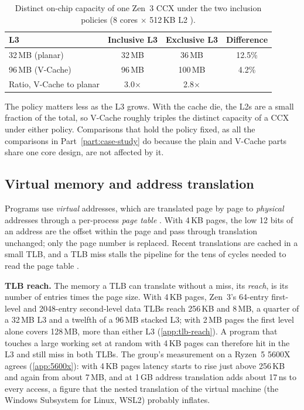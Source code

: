 \begin{table}[htbp]
  \centering
  \caption[Distinct on-chip capacity of one Zen~3 CCX under the two inclusion policies]{Distinct on-chip capacity of one Zen~3 CCX under the two inclusion policies (8 cores $\times$ 512\,KB L2 \cite[sec.~2.2]{amd2022epyc7003}).}
  \label{tab:inclusion-example}
  \small
  \begin{tabular}{@{}lccc@{}}
    \toprule
    \textbf{L3} & \textbf{Inclusive L3} & \textbf{Exclusive L3} & \textbf{Difference} \\
    \midrule
    32\,MB (planar) & 32\,MB & 36\,MB & 12.5\% \\
    96\,MB (V-Cache) & 96\,MB & 100\,MB & 4.2\% \\
    \midrule
    Ratio, V-Cache to planar & 3.0$\times$ & 2.8$\times$ & \\
    \bottomrule
  \end{tabular}
\end{table}

The policy matters less as the L3 grows. With the cache die, the L2s are a small fraction of the total, so V-Cache roughly triples the distinct capacity of a CCX under either policy. Comparisons that hold the policy fixed, as all the comparisons in Part~\ref{part:case-study} do because the plain and V-Cache parts share one core design, are not affected by it.

\subsection{Virtual memory and address translation}
\label{sec:virtual-memory}
Programs use \emph{virtual} addresses, which are translated page by page to \emph{physical} addresses through a per-process \emph{page table} \cite[sec.~11.4.3]{sarangi2025basic}. With 4\,KB pages, the low 12 bits of an address are the offset within the page and pass through translation unchanged; only the page number is replaced. Recent translations are cached in a small TLB, and a TLB miss stalls the pipeline for the tens of cycles needed to read the page table \cite[sec.~11.4.3]{sarangi2025basic}.

\textbf{TLB reach.} The memory a TLB can translate without a miss, its \emph{reach}, is its number of entries times the page size. With 4\,KB pages, Zen~3's 64-entry first-level and 2048-entry second-level data TLBs \cite{7-cpu.comAMDZen3} reach 256\,KB and 8\,MB, a quarter of a 32\,MB L3 and a twelfth of a 96\,MB stacked L3; with 2\,MB pages the first level alone covers 128\,MB, more than either L3 (\cref{app:tlb-reach}). A program that touches a large working set at random with 4\,KB pages can therefore hit in the L3 and still miss in both TLBs. The group's measurement on a Ryzen~5 5600X agrees (\cref{app:5600x}): with 4\,KB pages latency starts to rise just above 256\,KB and again from about 7\,MB, and at 1\,GB address translation adds about 17\,ns to every access, a figure that the nested translation of the virtual machine (the Windows Subsystem for Linux, WSL2) probably inflates.

